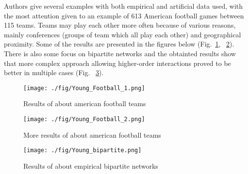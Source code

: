 \begin{itemize}
    Authors give several examples with both empirical and artificial data used, with the most attention given to an example of 613 American football games between 115 teams. Teams may play each other more often because of various reasons, mainly conferences (groups of team which all play each other) and geographical proximity. Some of the results are presented in the figures below (Fig.~\ref{Young_football_1}, ~\ref{Young_football_2}). There is also some focus on bipartite networks and the obtainted results show that more complex approach allowing higher-order interactions proved to be better in multiple cases (Fig. ~\ref{Young_bipartite}).

    \begin{figure}[h!]
	\begin{center}
        \texttt{[image: ./fig/Young\_Football\_1.png]}
        \caption{Results of \cite{Young2021} about american football teams} 
    	\label{Young_football_1}
    \end{center}
    \end{figure}

    \begin{figure}[h!]
	\begin{center}
        \texttt{[image: ./fig/Young\_Football\_2.png]}
        \caption{More results of \cite{Young2021} about american football teams} 
    	\label{Young_football_2}
    \end{center}
    \end{figure}

    \begin{figure}[h!]
	\begin{center}
        \texttt{[image: ./fig/Young\_bipartite.png]}
        \caption{Results of \cite{Young2021} about empirical bipartite networks} 
    	\label{Young_bipartite}
    \end{center}
    \end{figure}


\end{itemize}
